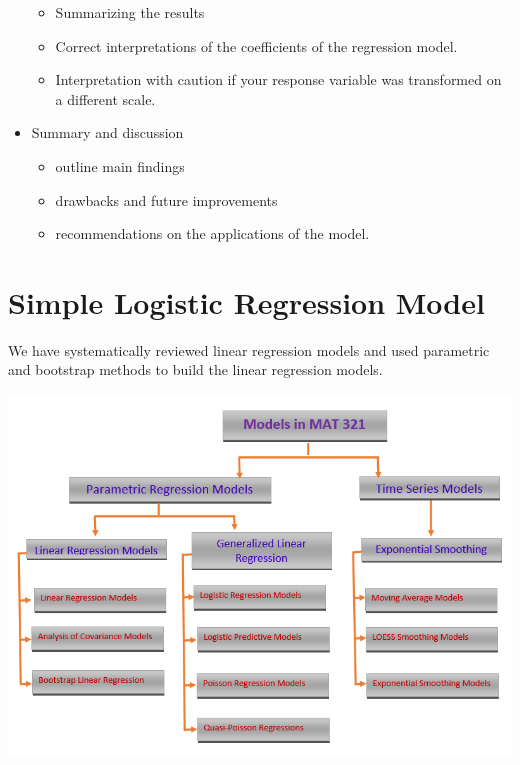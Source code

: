 \documentclass[
]{book}
\providecommand{\tightlist}{%
  \setlength{\itemsep}{0pt}\setlength{\parskip}{0pt}}
\begin{document}
\begin{itemize}
  \begin{itemize}
  \tightlist
  \item
    Summarizing the results
  \item
    Correct interpretations of the coefficients of the regression model.
  \item
    Interpretation with caution if your response variable was transformed on a different scale.
  \end{itemize}
\item
  Summary and discussion

  \begin{itemize}
  \tightlist
  \item
    outline main findings
  \item
    drawbacks and future improvements
  \item
    recommendations on the applications of the model.
  \end{itemize}
\end{itemize}

\hypertarget{simple-logistic-regression-model}{%
\chapter{Simple Logistic Regression Model}\label{simple-logistic-regression-model}}

We have systematically reviewed linear regression models and used parametric and bootstrap methods to build the linear regression models.

\hfill\break

\begin{center}\includegraphics[width=0.95\linewidth]{img06/w06-ModelSummary4MAT321} \end{center}
\end{document}
